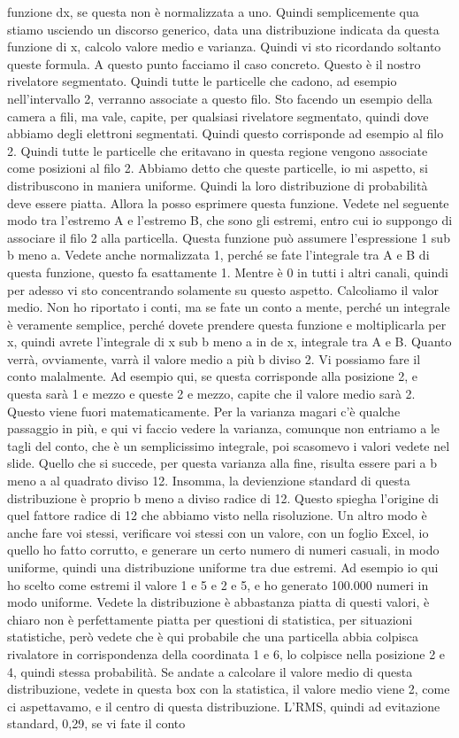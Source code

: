 {funzione dx, se questa non è normalizzata a uno. Quindi semplicemente qua stiamo usciendo un discorso generico, data una distribuzione indicata da questa funzione di x, calcolo valore medio e varianza. Quindi vi sto ricordando soltanto queste formula. A questo punto facciamo il caso concreto. Questo è il nostro rivelatore segmentato. Quindi tutte le particelle che cadono, ad esempio nell'intervallo 2, verranno associate a questo filo. Sto facendo un esempio della camera a fili, ma vale, capite, per qualsiasi rivelatore segmentato, quindi dove abbiamo degli elettroni segmentati. Quindi questo corrisponde ad esempio al filo 2. Quindi tutte le particelle che eritavano in questa regione vengono associate come posizioni al filo 2. Abbiamo detto che queste particelle, io mi aspetto, si distribuscono in maniera uniforme. Quindi la loro distribuzione di probabilità deve essere piatta. Allora la posso esprimere questa funzione. Vedete nel seguente modo tra l'estremo A e l'estremo B, che sono gli estremi, entro cui io suppongo di associare il filo 2 alla particella. Questa funzione può assumere l'espressione 1 sub b meno a. Vedete anche normalizzata 1, perché se fate l'integrale tra A e B di questa funzione, questo fa esattamente 1. Mentre è 0 in tutti i altri canali, quindi per adesso vi sto concentrando solamente su questo aspetto. Calcoliamo il valor medio. Non ho riportato i conti, ma se fate un conto a mente, perché un integrale è veramente semplice, perché dovete prendere questa funzione e moltiplicarla per x, quindi avrete l'integrale di x sub b meno a in de x, integrale tra A e B. Quanto verrà, ovviamente, varrà il valore medio a più b diviso 2. Vi possiamo fare il conto malalmente. Ad esempio qui, se questa corrisponde alla posizione 2, e questa sarà 1 e mezzo e queste 2 e mezzo, capite che il valore medio sarà 2. Questo viene fuori matematicamente. Per la varianza magari c'è qualche passaggio in più, e qui vi faccio vedere la varianza, comunque non entriamo a le tagli del conto, che è un semplicissimo integrale, poi scasomevo i valori vedete nel slide. Quello che si succede, per questa varianza alla fine, risulta essere pari a b meno a al quadrato diviso 12. Insomma, la devienzione standard di questa distribuzione è proprio b meno a diviso radice di 12. Questo spiegha l'origine di quel fattore radice di 12 che abbiamo visto nella risoluzione. Un altro modo è anche fare voi stessi, verificare voi stessi con un valore, con un foglio Excel, io quello ho fatto corrutto, e generare un certo numero di numeri casuali, in modo uniforme, quindi una distribuzione uniforme tra due estremi. Ad esempio io qui ho scelto come estremi il valore 1 e 5 e 2 e 5, e ho generato 100.000 numeri in modo uniforme. Vedete la distribuzione è abbastanza piatta di questi valori, è chiaro non è perfettamente piatta per questioni di statistica, per situazioni statistiche, però vedete che è qui probabile che una particella abbia colpisca rivalatore in corrispondenza della coordinata 1 e 6, lo colpisce nella posizione 2 e 4, quindi stessa probabilità. Se andate a calcolare il valore medio di questa distribuzione, vedete in questa box con la statistica, il valore medio viene 2, come ci aspettavamo, e il centro di questa distribuzione. L'RMS, quindi ad evitazione standard, 0,29, se vi fate il conto }
